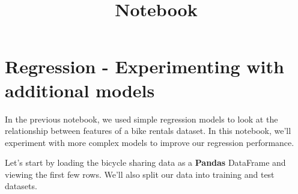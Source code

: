 \documentclass[11pt]{article}
\title{Notebook}
\begin{document}
    
    \maketitle
    
    

    
    \hypertarget{regression---experimenting-with-additional-models}{%
\section{Regression - Experimenting with additional
models}\label{regression---experimenting-with-additional-models}}

In the previous notebook, we used simple regression models to look at
the relationship between features of a bike rentals dataset. In this
notebook, we'll experiment with more complex models to improve our
regression performance.

Let's start by loading the bicycle sharing data as a \textbf{Pandas}
DataFrame and viewing the first few rows. We'll also split our data into
training and test datasets.
\end{document}
